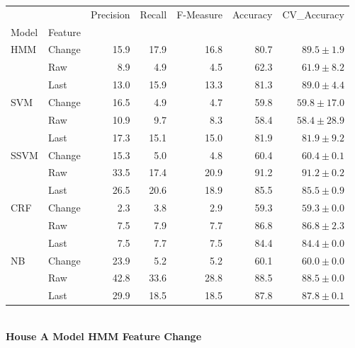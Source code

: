 \documentclass{article}
\begin{document}
\begin{tabular}{llrrrrr}
\toprule
    &        &  Precision &  Recall &  F-Measure &  Accuracy &    CV\_Accuracy \\
Model & Feature &            &         &            &           &                \\
\midrule
HMM & Change &       15.9 &    17.9 &       16.8 &      80.7 &   $89.5\pm1.9$ \\
    & Raw &        8.9 &     4.9 &        4.5 &      62.3 &   $61.9\pm8.2$ \\
    & Last &       13.0 &    15.9 &       13.3 &      81.3 &   $89.0\pm4.4$ \\
SVM & Change &       16.5 &     4.9 &        4.7 &      59.8 &  $59.8\pm17.0$ \\
    & Raw &       10.9 &     9.7 &        8.3 &      58.4 &  $58.4\pm28.9$ \\
    & Last &       17.3 &    15.1 &       15.0 &      81.9 &   $81.9\pm9.2$ \\
SSVM & Change &       15.3 &     5.0 &        4.8 &      60.4 &   $60.4\pm0.1$ \\
    & Raw &       33.5 &    17.4 &       20.9 &      91.2 &   $91.2\pm0.2$ \\
    & Last &       26.5 &    20.6 &       18.9 &      85.5 &   $85.5\pm0.9$ \\
CRF & Change &        2.3 &     3.8 &        2.9 &      59.3 &   $59.3\pm0.0$ \\
    & Raw &        7.5 &     7.9 &        7.7 &      86.8 &   $86.8\pm2.3$ \\
    & Last &        7.5 &     7.7 &        7.5 &      84.4 &   $84.4\pm0.0$ \\
NB & Change &       23.9 &     5.2 &        5.2 &      60.1 &   $60.0\pm0.0$ \\
    & Raw &       42.8 &    33.6 &       28.8 &      88.5 &   $88.5\pm0.0$ \\
    & Last &       29.9 &    18.5 &       18.5 &      87.8 &   $87.8\pm0.1$ \\
\bottomrule
\end{tabular}
\vspace{1cm}\\
\textbf{House A Model HMM Feature Change}\\
\vspace{1cm}\\
\end{document}
